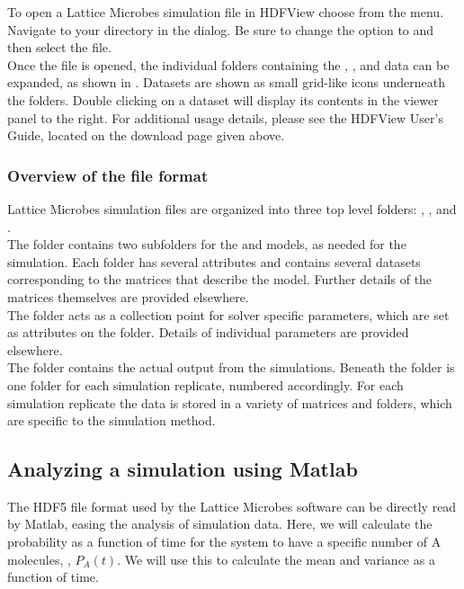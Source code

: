 To open a Lattice Microbes simulation file in HDFView choose  from the menu. Navigate to your  directory in the  dialog. Be sure to change the  option to  and then select the  file.\\

Once the file is opened, the individual folders containing the , , and  data can be expanded, as shown in . Datasets are shown as small grid-like icons underneath the folders. Double clicking on a dataset will display its contents in the viewer panel to the right. For additional usage details, please see the HDFView User's Guide, located on the download page given above.


\subsubsection{Overview of the file format}

Lattice Microbes simulation files are organized into three top level folders: , , and .\\

The  folder contains two subfolders for the  and  models, as needed for the simulation. Each folder has several attributes and contains several datasets corresponding to the matrices that describe the model. Further details of the matrices themselves are provided elsewhere.\\

The  folder acts as a collection point for solver specific parameters, which are set as attributes on the folder. Details of individual parameters are provided elsewhere.\\

The  folder contains the actual output from the simulations. Beneath the folder is one folder for each simulation replicate, numbered accordingly. For each simulation replicate the data is stored in a variety of matrices and folders, which are specific to the simulation method.

\subsection{Analyzing a simulation using Matlab}

The HDF5 file format used by the Lattice Microbes software can be directly read by Matlab, easing the analysis of simulation data. Here, we will calculate the probability as a function of time for the system to have a specific number of A molecules, {\ie}, $P_A(t)$. We will use this  to calculate the mean and variance as a function of time.\\

